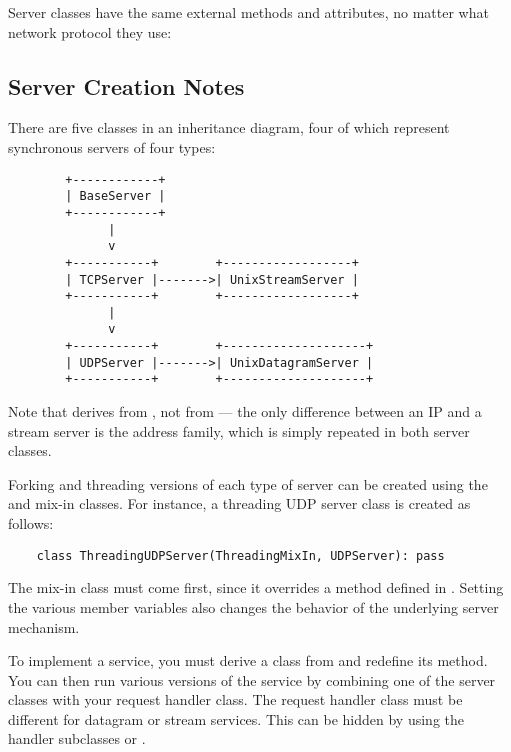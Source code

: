 Server classes have the same external methods and attributes, no
matter what network protocol they use:


\subsection{Server Creation Notes}

There are five classes in an inheritance diagram, four of which represent
synchronous servers of four types:

\begin{verbatim}
        +------------+
        | BaseServer |
        +------------+
              |
              v
        +-----------+        +------------------+
        | TCPServer |------->| UnixStreamServer |
        +-----------+        +------------------+
              |
              v
        +-----------+        +--------------------+
        | UDPServer |------->| UnixDatagramServer |
        +-----------+        +--------------------+
\end{verbatim}

Note that  derives from , not
from  --- the only difference between an IP and a
\UNIX{} stream server is the address family, which is simply repeated in both
\UNIX{} server classes.

Forking and threading versions of each type of server can be created using
the  and  mix-in classes.  For
instance, a threading UDP server class is created as follows:

\begin{verbatim}
    class ThreadingUDPServer(ThreadingMixIn, UDPServer): pass
\end{verbatim}

The mix-in class must come first, since it overrides a method defined in
.  Setting the various member variables also changes the
behavior of the underlying server mechanism.

To implement a service, you must derive a class from
 and redefine its  method.  You
can then run various versions of the service by combining one of the server
classes with your request handler class.  The request handler class must be
different for datagram or stream services.  This can be hidden by using the
handler subclasses  or .

